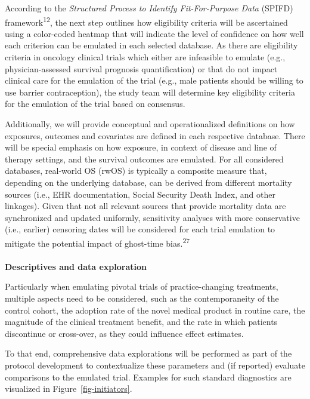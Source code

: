 \documentclass[
  letterpaper,
  DIV=11,
  numbers=noendperiod]{scrartcl}
\makeatletter
\let\oldparagraph\paragraph
\renewcommand{\paragraph}{
    \@ifstar
      \xxxParagraphStar
      \xxxParagraphNoStar
  }
\newcommand{\xxxParagraphStar}[1]{\oldparagraph*{#1}\mbox{}}
\newcommand{\xxxParagraphNoStar}[1]{\oldparagraph{#1}\mbox{}}
\makeatother
\begin{document}
According to the \emph{Structured Process to Identify Fit-For-Purpose
Data} (SPIFD) framework\textsuperscript{12}, the next step outlines how
eligibility criteria will be ascertained using a color-coded heatmap
that will indicate the level of confidence on how well each criterion
can be emulated in each selected database. As there are eligibility
criteria in oncology clinical trials which either are infeasible to
emulate (e.g., physician-assessed survival prognosis quantification) or
that do not impact clinical care for the emulation of the trial (e.g.,
male patients should be willing to use barrier contraception), the study
team will determine key eligibility criteria for the emulation of the
trial based on consensus.

Additionally, we will provide conceptual and operationalized definitions
on how exposures, outcomes and covariates are defined in each respective
database. There will be special emphasis on how exposure, in context of
disease and line of therapy settings, and the survival outcomes are
emulated. For all considered databases, real-world OS (rwOS) is
typically a composite measure that, depending on the underlying
database, can be derived from different mortality sources (i.e., EHR
documentation, Social Security Death Index, and other linkages). Given
that not all relevant sources that provide mortality data are
synchronized and updated uniformly, sensitivity analyses with more
conservative (i.e., earlier) censoring dates will be considered for each
trial emulation to mitigate the potential impact of ghost-time
bias.\textsuperscript{27}

\paragraph{\texorpdfstring{\textbf{Descriptives and data
exploration}}{Descriptives and data exploration}}\label{descriptives-and-data-exploration}

Particularly when emulating pivotal trials of practice-changing
treatments, multiple aspects need to be considered, such as the
contemporaneity of the control cohort, the adoption rate of the novel
medical product in routine care, the magnitude of the clinical treatment
benefit, and the rate in which patients discontinue or cross-over, as
they could influence effect estimates.

To that end, comprehensive data explorations will be performed as part
of the protocol development to contextualize these parameters and (if
reported) evaluate comparisons to the emulated trial. Examples for such
standard diagnostics are visualized in Figure~\ref{fig-initiators}.
\end{document}
